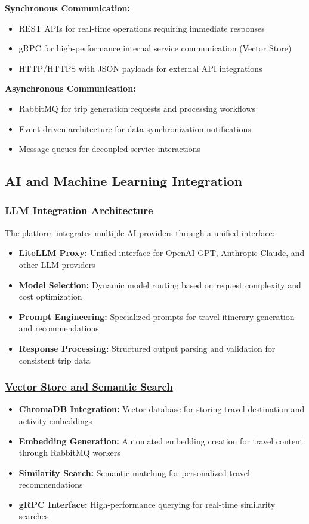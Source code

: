 \textbf{Synchronous Communication:}
\begin{itemize}
    \item REST APIs for real-time operations requiring immediate responses
    \item gRPC for high-performance internal service communication (Vector Store)
    \item HTTP/HTTPS with JSON payloads for external API integrations
\end{itemize}

\textbf{Asynchronous Communication:}
\begin{itemize}
    \item RabbitMQ for trip generation requests and processing workflows
    \item Event-driven architecture for data synchronization notifications
    \item Message queues for decoupled service interactions
\end{itemize}

\subsection{AI and Machine Learning Integration}

\subsubsection*{\underline{LLM Integration Architecture}}
The platform integrates multiple AI providers through a unified interface:

\begin{itemize}
    \item \textbf{LiteLLM Proxy:} Unified interface for OpenAI GPT, Anthropic Claude, and other LLM providers
    \item \textbf{Model Selection:} Dynamic model routing based on request complexity and cost optimization
    \item \textbf{Prompt Engineering:} Specialized prompts for travel itinerary generation and recommendations
    \item \textbf{Response Processing:} Structured output parsing and validation for consistent trip data
\end{itemize}

\subsubsection*{\underline{Vector Store and Semantic Search}}
\begin{itemize}
    \item \textbf{ChromaDB Integration:} Vector database for storing travel destination and activity embeddings
    \item \textbf{Embedding Generation:} Automated embedding creation for travel content through RabbitMQ workers
    \item \textbf{Similarity Search:} Semantic matching for personalized travel recommendations
    \item \textbf{gRPC Interface:} High-performance querying for real-time similarity searches
\end{itemize}

